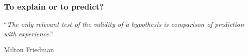 \begin{frame}
\frametitle{To explain or to predict?}
\begin{center}
{\huge ``\emph{The only relevant test of the validity of a hypothesis is comparison of prediction with experience}.''\par}
\vspace{1cm}
Milton Friedman
\end{center}
\end{frame}





